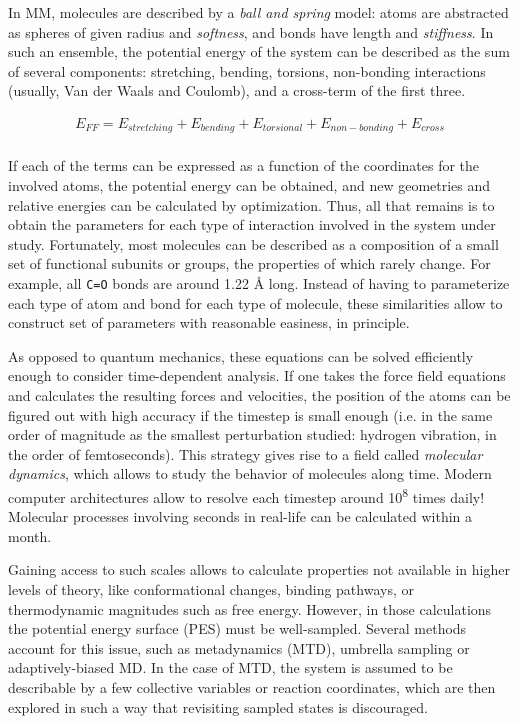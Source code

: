 In MM, molecules are described by a \textit{ball and spring} model: atoms are abstracted as spheres of given radius and \textit{softness}, and bonds have length and \textit{stiffness}. In such an ensemble, the potential energy of the system can be described as the sum of several components: stretching, bending, torsions, non-bonding interactions (usually, Van der Waals and Coulomb), and a cross-term of the first three.

 \begin{align}
	E_{FF}=E_{stretching}+E_{bending}+E_{torsional}+E_{non-bonding}+E_{cross} \\ \tag{Force field energy}
\end{align}

If each of the terms can be expressed as a function of the coordinates for the involved atoms, the potential energy can be obtained, and new geometries and relative energies can be calculated by optimization. Thus, all that remains is to obtain the parameters for each type of interaction involved in the system under study. Fortunately, most molecules can be described as a composition of a small set of functional subunits or groups, the properties of which rarely change. For example, all \texttt{C=O} bonds are around 1.22 Å long. Instead of having to parameterize each type of atom and bond for each type of molecule, these similarities allow to construct set of parameters with reasonable easiness, in principle.

As opposed to quantum mechanics, these equations can be solved efficiently enough to consider time-dependent analysis. If one takes the force field equations and calculates the resulting forces and velocities, the position of the atoms can be figured out with high accuracy if the timestep is small enough (i.e. in the same order of magnitude as the smallest perturbation studied: hydrogen vibration, in the order of femtoseconds). This strategy gives rise to a field called \textit{molecular dynamics}, which allows to study the behavior of molecules along time. Modern computer architectures allow to resolve each timestep around 10\textsuperscript{8} times daily! Molecular processes involving seconds in real-life can be calculated within a month.

Gaining access to such scales allows to calculate properties not available in  higher levels of theory, like conformational changes, binding pathways, or thermodynamic magnitudes such as free energy. However, in those calculations the potential energy surface (PES) must be well-sampled. Several methods account for this issue, such as metadynamics (MTD), umbrella sampling or adaptively-biased MD. In the case of MTD, the system is assumed to be describable by a few collective variables or reaction coordinates, which are then explored in such a way that revisiting sampled states is discouraged.

